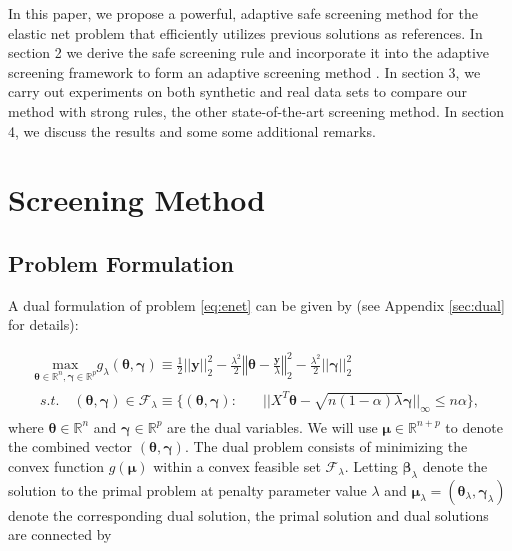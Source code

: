 In this paper, we propose a powerful, adaptive safe screening method for the elastic net problem that efficiently utilizes previous solutions as references. In section 2 we derive the safe screening rule and incorporate it into the adaptive screening framework to form an adaptive screening method . In section 3, we carry out experiments on both synthetic and real data sets to compare our method with strong rules, the other state-of-the-art screening method. In section 4, we discuss the results and some some additional remarks.

\section{Screening Method}
\subsection{Problem Formulation}

A dual formulation of problem \eqref{eq:enet} can be given by (see Appendix \ref{sec:dual} for details):

\begin{gather}
        \label{eq:dualtheta}
        \underset{\boldsymbol\theta\in \mathbb{R}^{ n},\boldsymbol\gamma\in\mathbb{R}^p}{\mathrm{max}}g_\lambda(\boldsymbol\theta,\boldsymbol\gamma)\equiv\frac{1}{2}||\boldsymbol y||_2^2-\frac{\lambda^2}{2}\left\Vert\boldsymbol\theta-\frac{\boldsymbol y}{\lambda}\right\Vert_2^2-\frac{\lambda^2}{2}||\boldsymbol\gamma||_2^2\\
        \begin{aligned}s.t.\quad (\boldsymbol\theta,\boldsymbol\gamma)\in \mathcal{F}_\lambda\equiv\{(\boldsymbol\theta,\boldsymbol\gamma):\quad
            &||X^T\boldsymbol\theta-\sqrt{n(1-\alpha)\lambda}\boldsymbol\gamma||_\infty\leq n\alpha\}\nonumber,
        \end{aligned}
\end{gather}
where $\boldsymbol\theta\in \mathbb{R}^{n}$ and $\boldsymbol\gamma\in\mathbb{R}^p$ are the dual variables. We will use $\boldsymbol\mu\in \mathbb{R}^{n+p}$ to denote the combined vector $(\boldsymbol \theta,\boldsymbol\gamma)$. The dual problem consists of minimizing the convex function $g(\boldsymbol\mu)$ within a convex feasible set $\mathcal{F}_\lambda$. Letting $\boldsymbol\beta_\lambda$ denote the solution to the primal problem at penalty parameter value $\lambda$ and $\boldsymbol\mu_{\lambda}=(\boldsymbol\theta_{\lambda},\boldsymbol\gamma_\lambda)$ denote the corresponding dual solution, the primal solution and dual solutions are connected by

